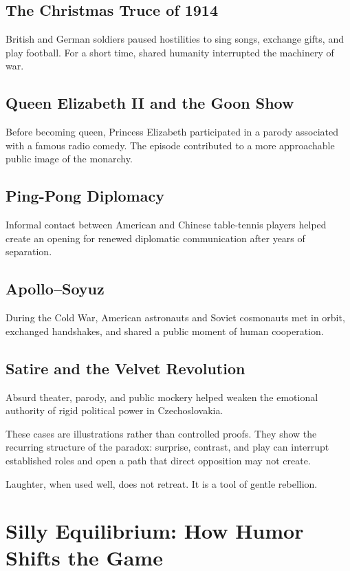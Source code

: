 \documentclass[11pt]{article}
\begin{document}
\subsection{The Christmas Truce of 1914}

British and German soldiers paused hostilities to sing songs, exchange gifts, and play football. For a short time, shared humanity interrupted the machinery of war.

\subsection{Queen Elizabeth II and the Goon Show}

Before becoming queen, Princess Elizabeth participated in a parody associated with a famous radio comedy. The episode contributed to a more approachable public image of the monarchy.

\subsection{Ping-Pong Diplomacy}

Informal contact between American and Chinese table-tennis players helped create an opening for renewed diplomatic communication after years of separation.

\subsection{Apollo--Soyuz}

During the Cold War, American astronauts and Soviet cosmonauts met in orbit, exchanged handshakes, and shared a public moment of human cooperation.

\subsection{Satire and the Velvet Revolution}

Absurd theater, parody, and public mockery helped weaken the emotional authority of rigid political power in Czechoslovakia.

These cases are illustrations rather than controlled proofs. They show the recurring structure of the paradox: surprise, contrast, and play can interrupt established roles and open a path that direct opposition may not create.

Laughter, when used well, does not retreat. It is a tool of gentle rebellion.

\section{Silly Equilibrium: How Humor Shifts the Game}
\end{document}
